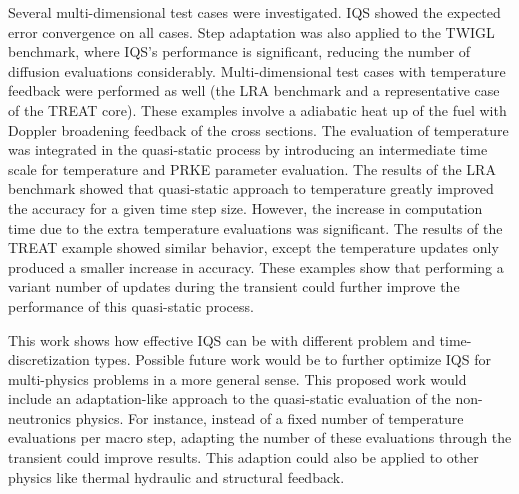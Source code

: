 \documentclass{elsarticle}
\begin{document}
Several multi-dimensional test cases were investigated. IQS showed the expected error convergence on all cases. Step adaptation was also applied to the TWIGL benchmark, where IQS's performance is significant, reducing the number of diffusion evaluations considerably. 
Multi-dimensional test cases with temperature feedback were performed as well (the LRA benchmark and a representative case of the TREAT core). 
These examples involve a adiabatic heat up of the fuel with Doppler broadening feedback of the cross sections. The evaluation of temperature was integrated in the quasi-static process by introducing an intermediate time scale for temperature and PRKE parameter evaluation. The results of the LRA benchmark showed that quasi-static approach to temperature greatly improved the accuracy for a given time step size. However, the increase in computation time due to the extra temperature evaluations was significant. The results of the TREAT example showed similar behavior, except the temperature updates only produced a smaller increase in accuracy. These examples show that performing a variant number of updates during the transient could further improve the performance of this quasi-static process. 

This work shows how effective IQS can be with different problem and time-discretization types. Possible future work would be to further optimize IQS for multi-physics problems in a more general sense. This proposed work would include an adaptation-like approach to the quasi-static evaluation of the non-neutronics physics. For instance, instead of a fixed number of temperature evaluations per macro step, adapting the number of these evaluations through the transient could improve results. This adaption could also be applied to other physics like thermal hydraulic and structural feedback.





\end{document}
